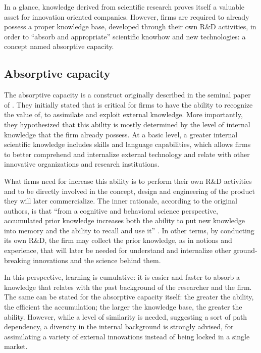 In a glance, knowledge derived from scientific research proves itself a valuable asset for innovation oriented companies. However, firms are required to already possess a proper knowledge base, developed through their own R\&D activities, in order to \enquote{absorb and appropriate} scientific knowhow and new technologies: a concept named absorptive capacity.

\subsection{Absorptive capacity}

The absorptive capacity is a construct originally described in the seminal paper of \citet{Cohen1990}. They initially stated that is critical for firms to have the ability to recognize the value of, to assimilate and exploit external knowledge. More importantly, they hypothesized that this ability is mostly determined by the level of internal knowledge that the firm already possess. At a basic level, a greater internal scientific knowledge includes skills and language capabilities, which allows firms to better comprehend and internalize external technology and relate with other innovative organizations and research institutions.

What firms need for increase this ability is to perform their own R\&D activities and to be directly involved in the concept, design and engineering of the product they will later commercialize. The inner rationale, according to the original authors, is that \enquote{from a cognitive and behavioral science perspective, accumulated prior knowledge increases both the ability to put new knowledge into memory and the ability to recall and use it} \citep{Cohen1990}. In other terms, by conducting its own R\&D, the firm may collect the prior knowledge, as in notions and experience, that will later be needed for understand and internalize other ground-breaking innovations and the science behind them. 

In this perspective, learning is cumulative: it is easier and faster to absorb a knowledge that relates with the past background of the researcher and the firm. The same can be stated for the absorptive capacity itself: the greater the ability, the efficient the accumulation; the larger the knowledge base, the greater the ability. However, while a level of similarity is needed, suggesting a sort of path dependency, a diversity in the internal background is strongly advised, for assimilating a variety of external innovations instead of being locked in a single market. 

